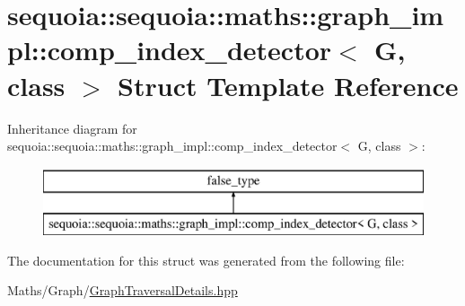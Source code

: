 \hypertarget{structsequoia_1_1sequoia_1_1maths_1_1graph__impl_1_1comp__index__detector}{}\section{sequoia\+::sequoia\+::maths\+::graph\+\_\+impl\+::comp\+\_\+index\+\_\+detector$<$ G, class $>$ Struct Template Reference}
\label{structsequoia_1_1sequoia_1_1maths_1_1graph__impl_1_1comp__index__detector}
Inheritance diagram for sequoia\+::sequoia\+::maths\+::graph\+\_\+impl\+::comp\+\_\+index\+\_\+detector$<$ G, class $>$\+:\begin{figure}[H]
\begin{center}
\leavevmode
\includegraphics[height=2.000000cm]{structsequoia_1_1sequoia_1_1maths_1_1graph__impl_1_1comp__index__detector}
\end{center}
\end{figure}


The documentation for this struct was generated from the following file\+:\begin{DoxyCompactItemize}
\item 
Maths/\+Graph/\mbox{\hyperlink{_graph_traversal_details_8hpp}{Graph\+Traversal\+Details.\+hpp}}\end{DoxyCompactItemize}
